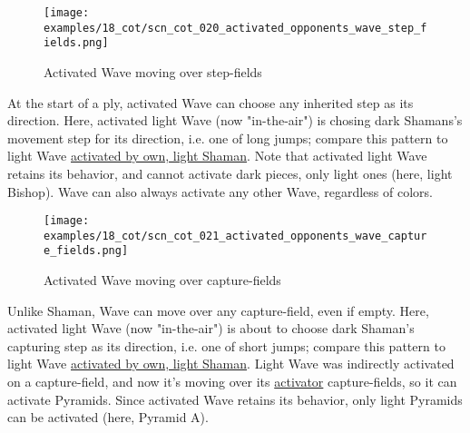 \clearpage %

\vspace*{-2.3\baselineskip}
\noindent
\begin{figure}[!h]
\texttt{[image: examples/18\_cot/scn\_cot\_020\_activated\_opponents\_wave\_step\_fields.png]}
\vspace*{-1.4\baselineskip}
\caption{Activated Wave moving over step-fields}
\label{fig:scn_cot_020_activated_opponents_wave_step_fields}
\end{figure}

\vspace*{-0.5\baselineskip}
At the start of a ply, activated Wave can choose any inherited step as its direction.
Here, activated light Wave (now "in-the-air") is chosing dark Shamans's movement
step for its direction, i.e. one of long jumps; compare this pattern to light Wave
\hyperref[fig:scn_cot_014_capture_activated_wave_step_fields]{activated by own, light Shaman}.\newline
\indent
Note that activated light Wave retains its behavior, and cannot activate dark
pieces, only light ones (here, light Bishop). Wave can also always activate any
other Wave, regardless of colors.

\clearpage %

\vspace*{-2.3\baselineskip}
\noindent
\begin{figure}[!h]
\texttt{[image: examples/18\_cot/scn\_cot\_021\_activated\_opponents\_wave\_capture\_fields.png]}
\vspace*{-1.4\baselineskip}
\caption{Activated Wave moving over capture-fields}
\label{fig:scn_cot_021_activated_opponents_wave_capture_fields}
\end{figure}

\vspace*{-0.5\baselineskip}
Unlike Shaman, Wave can move over any capture-field, even if empty. Here, activated
light Wave (now "in-the-air") is about to choose dark Shaman's capturing step as its
direction, i.e. one of short jumps; compare this pattern to light Wave
\hyperref[fig:scn_cot_015_capture_activated_wave_capture_fields]{activated by own, light Shaman}.\newline
\indent
Light Wave was indirectly activated on a capture-field, and now it's moving over
its \hyperref[sec:Terms/Activator]{activator} capture-fields, so it can activate
Pyramids. Since activated Wave retains its behavior, only light Pyramids can be
activated (here, Pyramid A).

